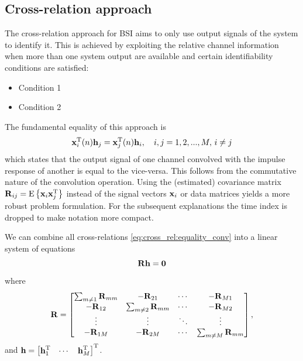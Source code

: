 \documentclass{article}
\newcommand{\h}{\mtxb{h}}
\newcommand{\x}{\mtxb{x}}
\newcommand{\R}{\mtxb{R}}
\begin{document}
\subsection{Cross-relation approach}
\label{ssec:cross_rel}
The cross-relation approach for BSI \cite{} aims to only use output signals of the system to identify it.
This is achieved by exploiting the relative channel information when more than one system output are available and certain identifiability conditions are satisfied:
\begin{itemize}
    \item Condition 1
    \item Condition 2
\end{itemize}

\noindent The fundamental equality of this approach is 
\begin{equation}
    \x_i^{\T}(n) \h_j = \x_j^{\T}(n) \h_i,\quad i,j=1,2,...,M,\,i\neq j\label{eq:cross_rel:equality_conv}
\end{equation}
which states that the output signal of one channel convolved with the impulse response of another is equal to the vice-versa.
This follows from the commutative nature of the convolution operation.
Using the (estimated) covariance matrix \(\R_{ij} = \ev{\x_i \x_j^\T}\) instead of the signal vectors \(\x_i\) or data matrices yields a more robust problem formulation.
For the subsequent explanations the time index is dropped to make notation more compact.

We can combine all cross-relations \eqref{eq:cross_rel:equality_conv} into a linear system of equations
\begin{equation}
    \R \h = \bm{0} \label{eq:cross_rel:null_space}\\
\end{equation}
where 
\begin{equation}
    \R = \begin{bmatrix}
        \sum_{m \neq 1} \R_{mm} & -\R_{21} & \cdots & -\R_{M1}\\
        -\R_{12} & \sum_{m \neq 2} \R_{mm} & \cdots & -\R_{M2}\\
        \vdots & \vdots & \ddots & \vdots\\
        -\R_{1M} & -\R_{2M} & \cdots & \sum_{m \neq M} \R_{mm}\\
    \end{bmatrix},\label{eq:cross_rel:data_matrix}
\end{equation}
and \(\h = \begin{bmatrix}
    \h_1^\T & \cdots & \h_M^\T
\end{bmatrix}^\T\).
\end{document}
